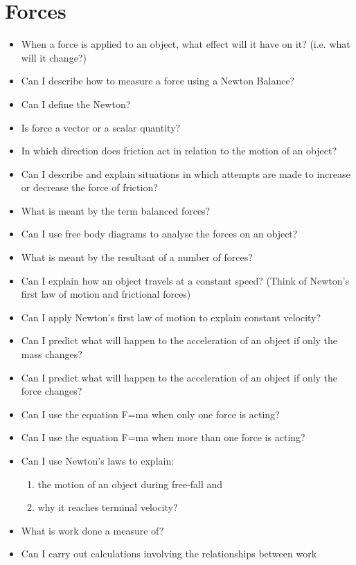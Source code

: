 \section{Forces}
\begin{multicols}{2}
	\begin{itemize}
		\item When a force is applied to an object, what effect will it have on it?
			(i.e. what will it change?)
		\item Can I describe how to measure a force using a Newton Balance?
		\item Can I define the Newton?
		\item Is force a vector or a scalar quantity?
		\item In which direction does friction act in relation to the motion of an
			object?
		\item Can I describe and explain situations in which attempts are made to
			increase or decrease the force of friction?
		\item What is meant by the term balanced forces? 
		\item Can I use free body diagrams to analyse the forces on an object?
		\item What is meant by the resultant of a number of forces?
		\item Can I explain how an object travels at a constant speed? (Think of
			Newton’s first law of motion and frictional forces)
		\item Can I apply Newton’s first law of motion to explain constant
			velocity?
		\item Can I predict what will happen to the acceleration of an object if only
			the mass changes?
		\item Can I predict what will happen to the acceleration of an object if only
			the force changes?
		\item Can I use the equation F=ma when only one force is acting?
		\item Can I use the equation F=ma when more than one force is acting?
		\item Can I use Newton’s laws to explain:
			\begin{enumerate}[label=(\alph*)]
				\item the motion of an object during free-fall and
				\item why it reaches terminal velocity?
			\end{enumerate}
		\item What is work done a measure of? 
		\item Can I carry out calculations involving the relationships between work

\end{itemize}
\end{multicols}
